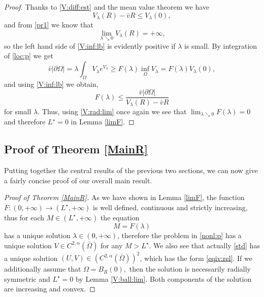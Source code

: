 \documentclass[12pt,a4paper]{amsart}
\theoremstyle{definition}
\theoremstyle{remark}
\numberwithin{equation}{section}
\numberwithin{theorem}{section}
\begin{document}
\begin{proof}
Thanks to \eqref{V:diff:est} and the mean value theorem we have
\begin{equation}\label{V:inf:lb}
V_\lambda(R)-\bar{v}R\leq V_\lambda(0),
\end{equation}
and from \eqref{pr1} we know that 
\begin{equation}\label{V:rad:lim}
\lim_{\lambda\searrow 0}V_\lambda(R)=+\infty,
\end{equation}
 so the left hand side of \eqref{V:inf:lb} is evidently positive if $\lambda$ is small.
By integration of \eqref{loc:p} we get
$$
\bar{v}|\partial\Omega|=\lambda\int_\Omega V_\lambda e^{V_\lambda}\geq  F(\lambda) \inf_{\Omega} V_\lambda = F(\lambda) V_\lambda(0),
$$
and using \eqref{V:inf:lb} we obtain,
\begin{equation}\label{F:up:bd}
F(\lambda)\leq \frac{\bar{v}|\partial\Omega|}{V_\lambda(R)-\bar{v}R}
\end{equation}
for small $\lambda$. Thus, using \eqref{V:rad:lim} once again we see that $\lim_{\lambda \searrow 0} F(\lambda) = 0$ and therefore $L^\star=0$ in Lemma \ref{limF}.
\end{proof}

\subsection{Proof of Theorem \ref{MainR}}

Putting together the central results of the previous two sections, we can now give a fairly concise proof of our overall main result.

\begin{proof}[Proof of Theorem \ref{MainR}]
As we have shown in Lemma \ref{limF}, the function $F:(0,+\infty)\rightarrow(L^\star,+\infty)$ is well defined, continuous and strictly increasing, thus for each $M\in(L^\star,+\infty)$ the equation
$$
M=F(\lambda)
$$
has a unique solution $\lambda\in(0,+\infty)$, therefore the problem in \eqref{nonl:p} has a unique solution $V\in C^{2,\alpha}(\bar{\Omega})$ for any $M>L^\star$. We also see that actually \eqref{std} has a unique solution $(U,V)\in (C^{2,\alpha}(\bar{\Omega}))^2$, which has the form \eqref{eqiv:rel}. If we additionally assume that $\Omega=B_R(0),$ then the solution is necessarily radially symmetric and $L^\star=0$ by Lemma \ref{V:ball:lim}. Both components of the solution are increasing and convex. 
\end{proof}
\end{document}
